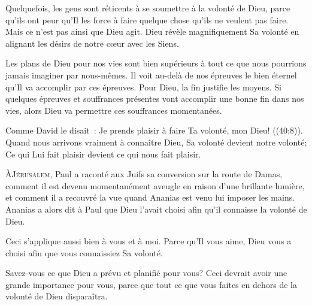 
Quelquefois, les gens sont réticents à se soumettre à la volonté de Dieu,
 parce qu'ils ont peur qu'Il les force à faire quelque chose
 qu'ils ne veulent pas faire. Mais ce n'est pas ainsi que Dieu agit.
 Dieu révèle magnifiquement Sa volonté en alignant les désirs de notre
 c\oe{}ur avec les Siens.

Les plans de Dieu pour nos vies sont bien supérieurs à tout
 ce que nous pourrions jamais imaginer par nous-mêmes.
 Il voit au-delà de nos épreuves le bien éternel qu'Il va accomplir
 par ces épreuves. Pour Dieu, la fin justifie les moyens.
 Si quelques épreuves et souffrances présentes vont accomplir
 une bonne fin dans nos vies, alors Dieu va permettre
 ces souffrances momentanées.

Comme David le disait~: 
 \og Je prends plaisir à faire Ta volonté, mon Dieu! \fg{}
 ((40:8)). Quand nous arrivons vraiment à connaître Dieu,
 Sa volonté devient notre volonté; Ce qui Lui fait plaisir
 devient ce qui nous fait plaisir.

\dvrule






\lettrine{À}{Jérusalem}, Paul a raconté aux Juifs sa conversion
 sur la route de Damas, comment il est devenu momentanément aveugle
 en raison d'une brillante lumière, et comment il a recouvré la vue
 quand Ananias est venu lui imposer les mains.
 Ananias a alors dit à Paul que Dieu l'avait choisi afin qu'il connaisse
 la volonté de Dieu.

Ceci s'applique aussi bien à vous et à moi.
 Parce qu'Il vous aime, Dieu vous a choisi afin que vous connaissiez Sa volonté.

Savez-vous ce que Dieu a prévu et planifié pour vous?
 Ceci devrait avoir une grande importance pour vous,
 parce que tout ce que vous faites en dehors de la volonté de Dieu disparaîtra.

